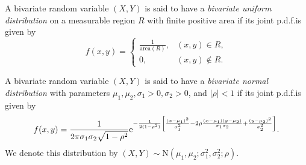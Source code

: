 \begin{definition}
  A bivariate random variable \((X, Y)\) is said to have a \emph{bivariate uniform distribution} on a measurable region \(R\) with finite positive area if its joint p.d.f.\@ is given by
  \[
    f(x, y) = \begin{cases}
      \frac{1}{\text{area}(R)}, & (x, y) \in R, \\
      0, & (x, y) \notin R.
    \end{cases}
  \]
\end{definition}

\begin{definition}
  A bivariate random variable \((X, Y)\) is said to have a \emph{bivariate normal distribution} with parameters \(\mu_1, \mu_2, \sigma_1 > 0, \sigma_2 > 0\), and \(|\rho| < 1\) if its joint p.d.f.\@ is given by
  \[
    f(x, y) = \frac{1}{2\mathrm{\pi} \sigma_1 \sigma_2 \sqrt{1 - \rho^2}} \mathrm{e}^{-\frac{1}{2(1 - \rho^2)} \left[\frac{(x - \mu_1)^2}{\sigma_1^2} - 2\rho \frac{(x - \mu_1)(y - \mu_2)}{\sigma_1 \sigma_2} + \frac{(y - \mu_2)^2}{\sigma_2^2}\right]}.
  \]
  We denote this distribution by \((X, Y) \sim \mathrm{N}(\mu_1, \mu_2; \sigma_1^2, \sigma_2^2; \rho)\).
\end{definition}

